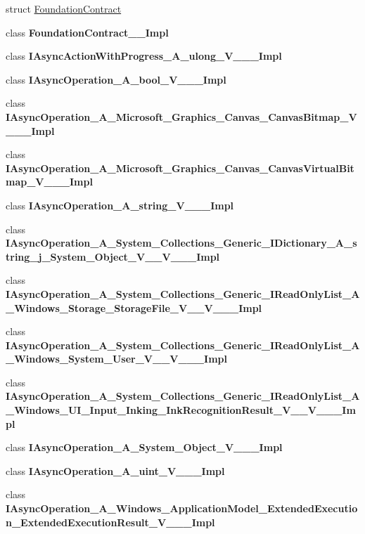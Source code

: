 \begin{DoxyCompactItemize}
\item 
struct \hyperlink{struct_windows_1_1_foundation_1_1_foundation_contract}{Foundation\+Contract}
\item 
class {\bfseries Foundation\+Contract\+\_\+\+\_\+\+Impl}
\item 
class {\bfseries I\+Async\+Action\+With\+Progress\+\_\+\+A\+\_\+ulong\+\_\+\+V\+\_\+\+\_\+\+\_\+\+Impl}
\item 
class {\bfseries I\+Async\+Operation\+\_\+\+A\+\_\+bool\+\_\+\+V\+\_\+\+\_\+\+\_\+\+Impl}
\item 
class {\bfseries I\+Async\+Operation\+\_\+\+A\+\_\+\+Microsoft\+\_\+\+Graphics\+\_\+\+Canvas\+\_\+\+Canvas\+Bitmap\+\_\+\+V\+\_\+\+\_\+\+\_\+\+Impl}
\item 
class {\bfseries I\+Async\+Operation\+\_\+\+A\+\_\+\+Microsoft\+\_\+\+Graphics\+\_\+\+Canvas\+\_\+\+Canvas\+Virtual\+Bitmap\+\_\+\+V\+\_\+\+\_\+\+\_\+\+Impl}
\item 
class {\bfseries I\+Async\+Operation\+\_\+\+A\+\_\+string\+\_\+\+V\+\_\+\+\_\+\+\_\+\+Impl}
\item 
class {\bfseries I\+Async\+Operation\+\_\+\+A\+\_\+\+System\+\_\+\+Collections\+\_\+\+Generic\+\_\+\+I\+Dictionary\+\_\+\+A\+\_\+string\+\_\+j\+\_\+\+System\+\_\+\+Object\+\_\+\+V\+\_\+\+\_\+\+V\+\_\+\+\_\+\+\_\+\+Impl}
\item 
class {\bfseries I\+Async\+Operation\+\_\+\+A\+\_\+\+System\+\_\+\+Collections\+\_\+\+Generic\+\_\+\+I\+Read\+Only\+List\+\_\+\+A\+\_\+\+Windows\+\_\+\+Storage\+\_\+\+Storage\+File\+\_\+\+V\+\_\+\+\_\+\+V\+\_\+\+\_\+\+\_\+\+Impl}
\item 
class {\bfseries I\+Async\+Operation\+\_\+\+A\+\_\+\+System\+\_\+\+Collections\+\_\+\+Generic\+\_\+\+I\+Read\+Only\+List\+\_\+\+A\+\_\+\+Windows\+\_\+\+System\+\_\+\+User\+\_\+\+V\+\_\+\+\_\+\+V\+\_\+\+\_\+\+\_\+\+Impl}
\item 
class {\bfseries I\+Async\+Operation\+\_\+\+A\+\_\+\+System\+\_\+\+Collections\+\_\+\+Generic\+\_\+\+I\+Read\+Only\+List\+\_\+\+A\+\_\+\+Windows\+\_\+\+U\+I\+\_\+\+Input\+\_\+\+Inking\+\_\+\+Ink\+Recognition\+Result\+\_\+\+V\+\_\+\+\_\+\+V\+\_\+\+\_\+\+\_\+\+Impl}
\item 
class {\bfseries I\+Async\+Operation\+\_\+\+A\+\_\+\+System\+\_\+\+Object\+\_\+\+V\+\_\+\+\_\+\+\_\+\+Impl}
\item 
class {\bfseries I\+Async\+Operation\+\_\+\+A\+\_\+uint\+\_\+\+V\+\_\+\+\_\+\+\_\+\+Impl}
\item 
class {\bfseries I\+Async\+Operation\+\_\+\+A\+\_\+\+Windows\+\_\+\+Application\+Model\+\_\+\+Extended\+Execution\+\_\+\+Extended\+Execution\+Result\+\_\+\+V\+\_\+\+\_\+\+\_\+\+Impl}

\end{DoxyCompactItemize}
